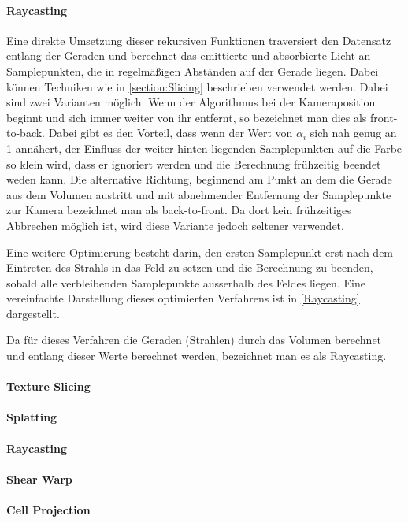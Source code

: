 \documentclass[a4paper,fontsize=12pt,toc=bib,halfparskip]{scrartcl}
\begin{document}
\paragraph{Raycasting}

Eine direkte Umsetzung dieser rekursiven Funktionen traversiert den Datensatz entlang der Geraden und berechnet das emittierte und absorbierte Licht an Samplepunkten, die in regelm\"a{\ss}igen Abst\"anden auf der Gerade liegen. Dabei k\"onnen Techniken wie in \ref{section:Slicing} beschrieben verwendet werden. Dabei sind zwei Varianten m\"oglich: Wenn der Algorithmus bei der Kameraposition beginnt und sich immer weiter von ihr entfernt, so bezeichnet man dies als front-to-back. Dabei gibt es den Vorteil, dass wenn der Wert von $\alpha_i$ sich nah genug an 1 ann\"ahert, der Einfluss der weiter hinten liegenden Samplepunkten auf die Farbe so klein wird, dass er ignoriert werden und die Berechnung fr\"uhzeitig beendet weden kann. Die alternative Richtung, beginnend am Punkt an dem die Gerade aus dem Volumen austritt und mit abnehmender Entfernung der Samplepunkte zur Kamera bezeichnet man als back-to-front. Da dort kein fr\"uhzeitiges Abbrechen m\"oglich ist, wird diese Variante jedoch seltener verwendet.

Eine weitere Optimierung besteht darin, den ersten Samplepunkt erst nach dem Eintreten des Strahls in das Feld zu setzen und die Berechnung zu beenden, sobald alle verbleibenden Samplepunkte ausserhalb des Feldes liegen. Eine vereinfachte Darstellung dieses optimierten Verfahrens ist in \ref{Raycasting} dargestellt.

Da f\"ur dieses Verfahren die Geraden (Strahlen) durch das Volumen berechnet und entlang dieser Werte berechnet werden, bezeichnet man es als Raycasting. 


\paragraph{Texture Slicing}
\paragraph{Splatting}
\paragraph{Raycasting}
\paragraph{Shear Warp}
\paragraph{Cell Projection}
\end{document}
